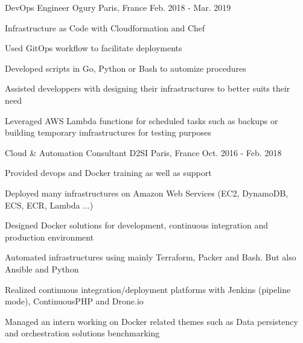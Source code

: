 \begin{cventries}
  \cventry
    {DevOps Engineer} %
    {Ogury} %
    {Paris, France} %
    {Feb. 2018 - Mar. 2019} %
    {
      \begin{cvitems} %
        \item {Infrastructure as Code with Cloudformation and Chef}
        \item {Used GitOps workflow to facilitate deployments}
        \item {Developed scripts in Go, Python or Bash to automize procedures}
        \item {Assisted developpers with designing their infrastructures to better suits their need}
        \item {Leveraged AWS Lambda functions for scheduled tasks such as backups or building temporary imfrastructures for testing purposes}
      \end{cvitems}
    }

  \cventry
    {Cloud \& Automation Consultant} %
    {D2SI} %
    {Paris, France} %
    {Oct. 2016 - Feb. 2018} %
    {
      \begin{cvitems} %
        \item {Provided devops and Docker training as well as support}
        \item {Deployed many infrastructures on Amazon Web Services (EC2, DynamoDB, ECS, ECR, Lambda ...)}
        \item {Designed Docker solutions for development, continuous integration and production environment}
        \item {Automated infrastructures using mainly Terraform, Packer and Bash. But also Ansible and Python}
        \item {Realized continuous integration/deployment platforms with Jenkins (pipeline mode), ContinuousPHP and Drone.io}
        \item {Managed an intern working on Docker related themes such as Data persistency and orchestration solutions benchmarking}
      \end{cvitems}
    }


\end{cventries}
